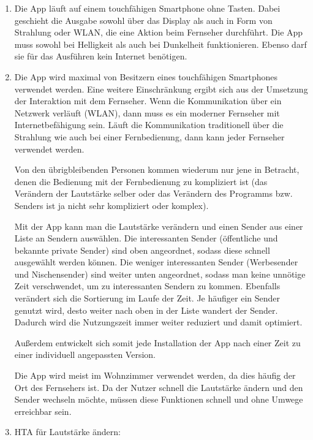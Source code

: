 \documentclass[a4paper,10pt]{scrartcl}
\begin{document}
\kopf
\renewcommand{\figurename}{Figure}


	\begin{enumerate}
		\item 
		Die App läuft auf einem touchfähigen Smartphone ohne Tasten. Dabei geschieht die Ausgabe sowohl über das Display als auch in Form von Strahlung oder WLAN, die eine Aktion beim Fernseher durchführt. Die App muss sowohl bei Helligkeit als auch bei Dunkelheit funktionieren. Ebenso darf sie für das Ausführen kein Internet benötigen.
		\item 
		Die App wird maximal von Besitzern eines touchfähigen Smartphones verwendet werden. Eine weitere Einschränkung ergibt sich aus der Umsetzung der Interaktion mit dem Fernseher. Wenn die Kommunikation über ein Netzwerk verläuft (WLAN), dann muss es ein moderner Fernseher mit Internetbefähigung sein. Läuft die Kommunikation traditionell über die Strahlung wie auch bei einer Fernbedienung, dann kann jeder Fernseher verwendet werden.
		
		Von den übrigbleibenden Personen kommen wiederum nur jene in Betracht, denen die Bedienung mit der Fernbedienung zu kompliziert ist (das Verändern der Lautstärke selber oder das Verändern des Programms bzw. Senders ist ja nicht sehr kompliziert oder komplex).
		
		Mit der App kann man die Lautstärke verändern und einen Sender aus einer Liste an Sendern auswählen. Die interessanten Sender (öffentliche und bekannte private Sender) sind oben angeordnet, sodass diese schnell ausgewählt werden können. Die weniger interessanten Sender (Werbesender und Nischensender) sind weiter unten angeordnet, sodass man keine unnötige Zeit verschwendet, um zu interessanten Sendern zu kommen. Ebenfalls verändert sich die Sortierung im Laufe der Zeit. Je häufiger ein Sender genutzt wird, desto weiter nach oben in der Liste wandert der Sender. Dadurch wird die Nutzungszeit immer weiter reduziert und damit optimiert.

		Außerdem entwickelt sich somit jede Installation der App nach einer Zeit zu einer individuell angepassten Version.
		
		Die App wird meist im Wohnzimmer verwendet werden, da dies häufig der Ort des Fernsehers ist. Da der Nutzer schnell die Lautstärke ändern und den Sender wechseln möchte, müssen diese Funktionen schnell und ohne Umwege erreichbar sein.
		\setcounter{enumi}{3}
		\item HTA für Lautstärke ändern: \\
\begin{tikzpicture}[
	goal/.style={rectangle,draw,fill=yellow!40,align=left},
	plan/.style={align=left},
	level 1/.style={sibling distance=7.7em},
	nextLevel/.style={level distance=40ex},
  	nextLevel2/.style={level distance=30ex},
  	nextLevel3/.style={level distance=18ex}]
	

\end{tikzpicture}
\end{enumerate}
\end{document}
